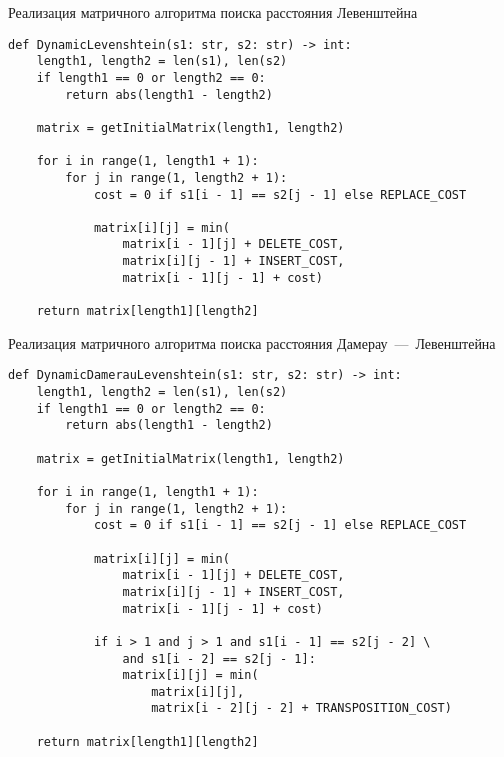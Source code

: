 \begin{listing}
\caption{Реализация матричного алгоритма поиска расстояния Левенштейна}
\label{lst:dyn_lev}
\begin{verbatim}
def DynamicLevenshtein(s1: str, s2: str) -> int:
    length1, length2 = len(s1), len(s2)
    if length1 == 0 or length2 == 0:
        return abs(length1 - length2)
    
    matrix = getInitialMatrix(length1, length2)

    for i in range(1, length1 + 1):
        for j in range(1, length2 + 1): 
            cost = 0 if s1[i - 1] == s2[j - 1] else REPLACE_COST
           
            matrix[i][j] = min(
                matrix[i - 1][j] + DELETE_COST, 
                matrix[i][j - 1] + INSERT_COST,
                matrix[i - 1][j - 1] + cost)

    return matrix[length1][length2]
\end{verbatim}
\end{listing}

\begin{listing}
\caption{Реализация матричного алгоритма поиска расстояния Дамерау~---~Левенштейна}
\label{lst:dyn_dam_lev}
\begin{verbatim}
def DynamicDamerauLevenshtein(s1: str, s2: str) -> int:
    length1, length2 = len(s1), len(s2)
    if length1 == 0 or length2 == 0:
        return abs(length1 - length2)

    matrix = getInitialMatrix(length1, length2)

    for i in range(1, length1 + 1):
        for j in range(1, length2 + 1):
            cost = 0 if s1[i - 1] == s2[j - 1] else REPLACE_COST

            matrix[i][j] = min(
                matrix[i - 1][j] + DELETE_COST,
                matrix[i][j - 1] + INSERT_COST,
                matrix[i - 1][j - 1] + cost)

            if i > 1 and j > 1 and s1[i - 1] == s2[j - 2] \
                and s1[i - 2] == s2[j - 1]:
                matrix[i][j] = min(
                    matrix[i][j], 
                    matrix[i - 2][j - 2] + TRANSPOSITION_COST)

    return matrix[length1][length2]
\end{verbatim}
\end{listing}

